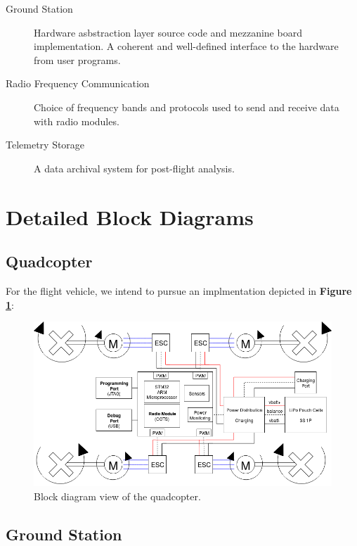 \documentclass{article}
\begin{document}
\begin{description}
	\item [Ground Station] Hardware asbstraction layer source code and
		mezzanine board implementation. A coherent and well-defined interface
		to the hardware from user programs.
	\item [Radio Frequency Communication] Choice of frequency bands and
		protocols used to send and receive data with radio modules.
	\item [Telemetry Storage] A data archival system for post-flight analysis.
\end{description}

\section{Detailed Block Diagrams}

\subsection{Quadcopter}

For the flight vehicle, we intend to pursue an implmentation depicted in
\textbf{Figure \ref{fig:quadcopter}}:

\begin{figure}[H]
	\centering
	\includegraphics[width=\linewidth]{../src/im/quadcopter}
	\caption{Block diagram view of the quadcopter.}
	\label{fig:quadcopter}
\end{figure}


\pagebreak

\subsection{Ground Station}
\end{document}
